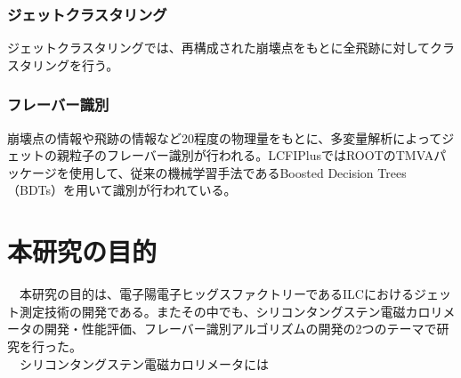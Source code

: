 \subsubsection{ジェットクラスタリング}
ジェットクラスタリングでは、再構成された崩壊点をもとに全飛跡に対してクラスタリングを行う。
\subsubsection{フレーバー識別}
崩壊点の情報や飛跡の情報など20程度の物理量をもとに、多変量解析によってジェットの親粒子のフレーバー識別が行われる。LCFIPlusではROOTのTMVAパッケージを使用して、従来の機械学習手法であるBoosted Decision Trees（BDTs）を用いて識別が行われている。
\section{本研究の目的}
　本研究の目的は、電子陽電子ヒッグスファクトリーであるILCにおけるジェット測定技術の開発である。またその中でも、シリコンタングステン電磁カロリメータの開発・性能評価、フレーバー識別アルゴリズムの開発の2つのテーマで研究を行った。\\
　シリコンタングステン電磁カロリメータには